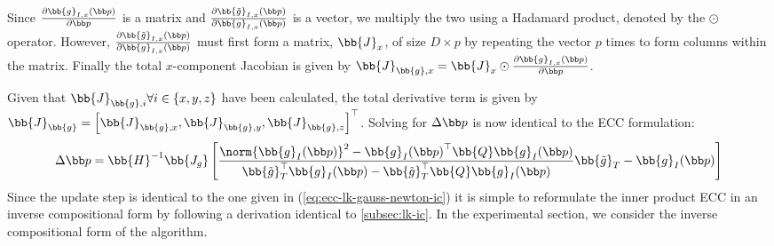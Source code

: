 Since $\frac{\partial \bb{g}_{I,x}(\p)}{\partial \p}$ is a matrix and
$\frac{\partial \bb{\tilde{g}}_{I,x}(\p)}{\partial \bb{g}_{I,x}(\p)}$ is
a vector, we multiply the two using a Hadamard product, denoted
by the $\odot$ operator. However, $\frac{\partial
\bb{\tilde{g}}_{I,x}(\p)}{\partial \bb{g}_{I,x}(\p)}$ must first form a
matrix, $\bb{J}_x$, of size $D \times p$ by repeating the vector $p$
times to form columns within the matrix. Finally the total $x$-component
Jacobian is given by
$\bb{J}_{\bb{g},x} = \bb{J}_x \odot \frac{\partial \bb{g}_{I,x}(\p)}{\partial \p}$.

Given that $\bb{J}_{\bb{g},i} \forall i \in \{ x,y,z \}$ have been
calculated, the total derivative term is given by
 $\bb{J}_{\bb{g}} = {\left[ \bb{J}_{\bb{g},x}, \bb{J}_{\bb{g},y}, \bb{J}_{\bb{g},z} \right]}^{\top}$. 
Solving for $\Delta \p$ is now identical to the ECC formulation:
\begin{equation}\label{eq:ip-ecc-lk-gauss-newton}
    \Delta \p = \bb{H}^{-1} \bb{J_g} \left[ \frac{\norm{\bb{g}_I(\p)}^2 - {\bb{g}_I(\p)}^{\top} \bb{Q} \bb{g}_I(\p)}{\bb{\tilde{g}}_T^{\top} \bb{g}_I(\p) - \bb{\tilde{g}}_T^{\top} \bb{Q} \bb{g}_I(\p)} \bb{\tilde{g}}_T - \bb{g}_I(\p) \right]
\end{equation}
Since the update step is identical to the one given in 
(\ref{eq:ecc-lk-gauss-newton-ic}) it is simple to reformulate the inner product 
ECC in an inverse compositional form by following a derivation identical to 
\cref{subsec:lk-ic}. In the experimental section, we consider the inverse
compositional form of the algorithm.
